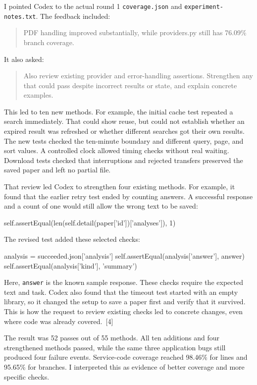 \documentclass[10pt,letterpaper]{article}
\begin{document}
I pointed Codex to the actual round 1 \texttt{coverage.json} and \texttt{experiment-notes.txt}. The feedback included:
\begin{quote}
\small
PDF handling improved substantially, while providers.py still has 76.09\% branch coverage.
\end{quote}
It also asked:
\begin{quote}
\small
Also review existing provider and error-handling assertions. Strengthen any that could pass despite incorrect results or state, and explain concrete examples.
\end{quote}

This led to ten new methods. For example, the initial cache test repeated a search immediately. That could show reuse, but could not establish whether an expired result was refreshed or whether different searches got their own results. The new tests checked the ten-minute boundary and different query, page, and sort values. A controlled clock allowed timing checks without real waiting. Download tests checked that interruptions and rejected transfers preserved the saved paper and left no partial file.

That review led Codex to strengthen four existing methods. For example, it found that the earlier retry test ended by counting answers. A successful response and a count of one would still allow the wrong text to be saved:
\begin{reportcode}
self.assertEqual(len(self.detail(paper['id'])['analyses']), 1)
\end{reportcode}
The revised test added these selected checks:
\begin{reportcode}
analysis = succeeded.json['analysis']
self.assertEqual(analysis['answer'], answer)
self.assertEqual(analysis['kind'], 'summary')
\end{reportcode}
Here, \texttt{answer} is the known sample response. These checks require the expected text and task. Codex also found that the timeout test started with an empty library, so it changed the setup to save a paper first and verify that it survived. This is how the request to review existing checks led to concrete changes, even where code was already covered.~[4]

The result was 52 passes out of 55 methods. All ten additions and four strengthened methods passed, while the same three application bugs still produced four failure events. Service-code coverage reached 98.46\% for lines and 95.65\% for branches. I interpreted this as evidence of better coverage and more specific checks.
\end{document}
